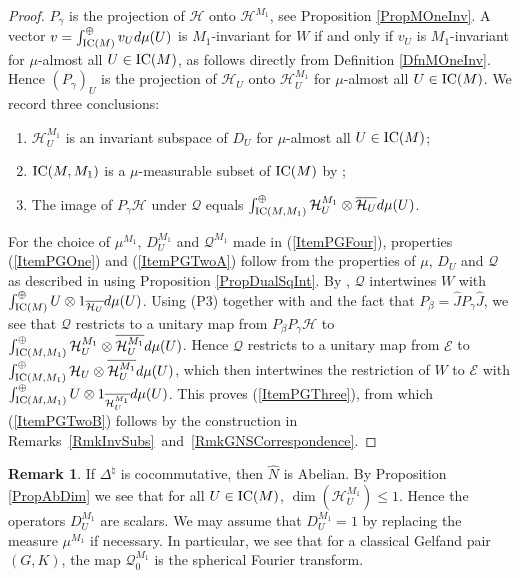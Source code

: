 \documentclass[pdftex]{sigma}
\numberwithin{equation}{section}
\theoremstyle{definition}
\newtheorem{rmk}[thm]{Remark}
\newcommand{\cHil}{\mathcal{H}}
\newcommand{\ICM}{\text{\rm IC}(M)}
\newcommand{\ICMM}{\text{\rm IC}(M, M_1)}
\begin{document}
\begin{proof}
 $P_\gamma$ is the projection of $\cHil$ onto $\cHil^{M_1}$, see Proposition \ref{PropMOneInv}. A vector $v = \int^{\oplus}_{\ICM} v_U d\mu(U)$ is $M_1$-invariant for $W$ if and only if $v_U$ is $M_1$-invariant for $\mu$-almost all $U \in \ICM$, as follows directly from Def\/inition \ref{DfnMOneInv}. Hence $(P_\gamma)_U$ is the projection of $\cHil_U$ onto $\cHil_U^{M_1}$ for $\mu$-almost all $U \in \ICM$. We record three conclusions:
\begin{enumerate}\itemsep=0pt
\item[(P1)] $\cHil_U^{M_1}$ is an invariant subspace of $D_U$ for $\mu$-almost all $U \in \ICM$;
\item[(P2)]  $\ICMM$ is a $\mu$-measurable subset of $\ICM$ by \cite[Proposition II.1.1 (i)]{DixVNA};
\item[(P3)]  The image of $P_\gamma \cHil$ under $\mathcal{Q}$ equals $\int_{\ICMM}^\oplus \cHil_U^{M_1} \otimes \overline{\cHil_U} d\mu(U)$.

\end{enumerate}

For the choice of $\mu^{M_1}$, $D_U^{M_1}$ and $\mathcal{Q}^{M_1}$ made in (\ref{ItemPGFour}), properties (\ref{ItemPGOne}) and (\ref{ItemPGTwoA}) follow from the properties of $\mu$, $D_U$ and $\mathcal{Q}$ as described in \cite[Theorem 3.4.1]{Des} using Proposition \ref{PropDualSqInt}.
 By \cite[Theorem 3.4.1]{Des}, $\mathcal{Q}$ intertwines $W$ with $\int_{\ICM}^\oplus U \otimes 1_{\overline{\cHil_U}} d\mu(U)$. Using (P3) together with \cite[Theorem 3.4.5 (3)]{Des} and the fact that $P_\beta = \hat{J} P_\gamma \hat{J}$, we see that $\mathcal{Q}$ restricts to a unitary map from $P_\beta P_\gamma \cHil$ to  $\int_{\ICMM}^\oplus \cHil_U^{M_1} \otimes \overline{\cHil_U^{M_1}} d\mu(U)$. Hence $\mathcal{Q}$ restricts to a unitary map from $\mathcal{E}$ to~$\int_{\ICMM}^\oplus \cHil_U  \otimes \overline{\cHil_U^{M_1}} d\mu(U)$, which then intertwines the restriction of $W$ to $\mathcal{E}$ with $\int^\oplus_{\ICMM}   U \otimes 1_{\overline{\cHil_U^{M_1}}}d\mu(U)$. This proves (\ref{ItemPGThree}), from which (\ref{ItemPGTwoB}) follows by the construction in Re\-marks~\ref{RmkInvSubs}~and~\ref{RmkGNSCorrespondence}.
\end{proof}

\begin{rmk}
If $\Delta^\natural$ is cocommutative, then $\hat{N}$ is Abelian. By Proposition \ref{PropAbDim} we see that for all $U \in \ICM$, $\dim(\cHil_U^{M_1}) \leq 1$. Hence the operators $D_U^{M_1}$ are scalars. We may assume that $D_U^{M_1} = 1$ by replacing the measure $\mu^{M_1}$ if necessary.  In particular, we see that for a classical Gelfand pair $(G, K)$, the map $\mathcal{Q}_0^{M_1}$ is the spherical Fourier transform.
\end{rmk}
\end{document}
